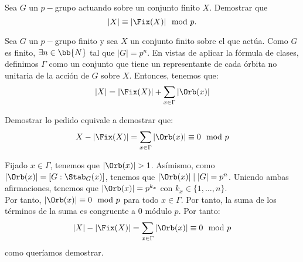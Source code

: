 \begin{ejercicio}\label{ej:6.12}
    Sea $G$ un $p-$grupo actuando sobre un conjunto finito $X$. Demostrar que
    \[
        |X| \equiv |\Fix(X)| \mod p.
    \]

    Sea $G$ un $p-$grupo finito y sea $X$ un conjunto finito sobre el que actúa. Como $G$ es finito, $\exists n\in \bb{N}$ tal que $|G|=p^n$.
    En vistas de aplicar la fórmula de clases, definimos $\Gamma$ como un conjunto que tiene un representante de cada órbita no unitaria de la acción de $G$ sobre $X$. Entonces, tenemos que:
    \begin{equation*}
        |X| = |\Fix(X)| + \sum_{x\in \Gamma} |\Orb(x)|
    \end{equation*}

    Demostrar lo pedido equivale a demostrar que:
    \begin{equation*}
        X-|\Fix(X)| = \sum_{x\in \Gamma} |\Orb(x)| \equiv 0 \mod p
    \end{equation*}

    Fijado $x\in \Gamma$, tenemos que $|\Orb(x)|>1$. Asímismo, como $|\Orb(x)|=[G:\Stab_G(x)]$, tenemos que $|\Orb(x)|\mid |G|=p^n$. Uniendo ambas afirmaciones, tenemos que $|\Orb(x)|=p^{k_x}$ con $k_x\in \{1,\ldots,n\}$.\\

    Por tanto, $|\Orb(x)|\equiv 0 \mod p$ para todo $x\in \Gamma$. Por tanto, la suma de los términos de la suma es congruente a $0$ módulo $p$. Por tanto:
    \begin{equation*}
        |X| - |\Fix(X)| = \sum_{x\in \Gamma} |\Orb(x)| \equiv 0 \mod p
    \end{equation*}
    como queríamos demostrar.
\end{ejercicio}

